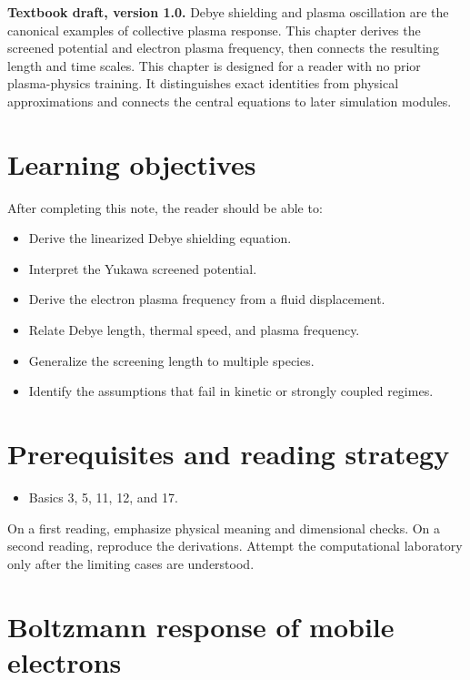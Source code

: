 \documentclass[11pt]{article}
\begin{document}

\begin{overviewbox}
\textbf{Textbook draft, version 1.0.} Debye shielding and plasma oscillation are the canonical examples of collective plasma response. This chapter derives the screened potential and electron plasma frequency, then connects the resulting length and time scales. This chapter is designed for a reader with no prior plasma-physics training. It distinguishes exact identities from physical approximations and connects the central equations to later simulation modules.
\end{overviewbox}

\ProjectTOC

\section{Learning objectives}
After completing this note, the reader should be able to:
\begin{itemize}[leftmargin=1.6em]
\item Derive the linearized Debye shielding equation.
\item Interpret the Yukawa screened potential.
\item Derive the electron plasma frequency from a fluid displacement.
\item Relate Debye length, thermal speed, and plasma frequency.
\item Generalize the screening length to multiple species.
\item Identify the assumptions that fail in kinetic or strongly coupled regimes.
\end{itemize}

\section{Prerequisites and reading strategy}
\begin{itemize}[leftmargin=1.6em]
\item Basics 3, 5, 11, 12, and 17.
\end{itemize}
On a first reading, emphasize physical meaning and dimensional checks. On a second reading, reproduce the derivations. Attempt the computational laboratory only after the limiting cases are understood.

\section{Boltzmann response of mobile electrons}
\end{document}
